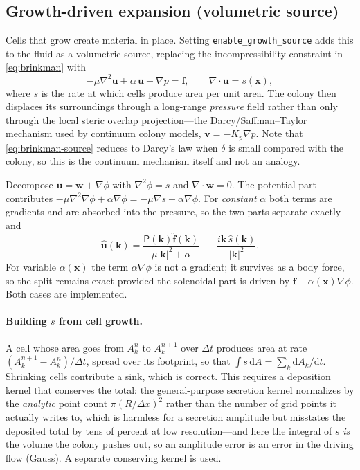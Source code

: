 \documentclass[11pt]{article}
\newcommand{\vu}{\bm{u}}
\newcommand{\vf}{\bm{f}}
\newcommand{\vx}{\bm{x}}
\newcommand{\vk}{\bm{k}}
\newcommand{\grad}{\nabla}
\newcommand{\dt}{\Delta t}
\newcommand{\dx}{\Delta x}
\begin{document}
\subsection{Growth-driven expansion (volumetric source)}\label{sec:growthsource}
Cells that grow create material in place. Setting
\texttt{enable\_growth\_source} adds this to the fluid as a volumetric source,
replacing the incompressibility constraint in \eqref{eq:brinkman} with
\begin{equation}
  -\mu\grad^2\vu + \alpha\,\vu + \grad p = \vf, \qquad
  \grad\cdot\vu = s(\vx),
  \label{eq:brinkman-source}
\end{equation}
where $s$ is the rate at which cells produce area per unit area. The colony then
displaces its surroundings through a long-range \emph{pressure} field rather than
only through the local steric overlap projection---the Darcy/Saffman--Taylor
mechanism used by continuum colony models, $\bm{v} = -K_p\grad p$. Note that
\eqref{eq:brinkman-source} reduces to Darcy's law when $\delta$ is small compared
with the colony, so this is the continuum mechanism itself and not an analogy.

Decompose $\vu = \bm{w} + \grad\phi$ with $\grad^2\phi = s$ and
$\grad\cdot\bm{w} = 0$. The potential part contributes
$-\mu\grad^2\grad\phi + \alpha\grad\phi = -\mu\grad s + \alpha\grad\phi$. For
\emph{constant} $\alpha$ both terms are gradients and are absorbed into the
pressure, so the two parts separate exactly and
\begin{equation}
  \hat{\vu}(\vk) = \frac{\mathsf{P}(\vk)\hat{\vf}(\vk)}{\mu\lvert\vk\rvert^2+\alpha}
  \;-\; \frac{i\vk\,\hat{s}(\vk)}{\lvert\vk\rvert^2}.
\end{equation}
For variable $\alpha(\vx)$ the term $\alpha\grad\phi$ is not a gradient; it
survives as a body force, so the split remains exact provided the solenoidal part
is driven by $\vf - \alpha(\vx)\grad\phi$. Both cases are implemented.

\paragraph{Building $s$ from cell growth.} A cell whose area goes from $A_k^{n}$
to $A_k^{n+1}$ over $\dt$ produces area at rate $(A_k^{n+1}-A_k^{n})/\dt$, spread
over its footprint, so that
$\int s\,\mathrm{d}A = \sum_k \mathrm{d}A_k/\mathrm{d}t$. Shrinking cells
contribute a sink, which is correct. This requires a deposition kernel that
conserves the total: the general-purpose secretion kernel normalizes by the
\emph{analytic} point count $\pi(R/\dx)^2$ rather than the number of grid points
it actually writes to, which is harmless for a secretion amplitude but misstates
the deposited total by tens of percent at low resolution---and here the integral
of $s$ \emph{is} the volume the colony pushes out, so an amplitude error is an
error in the driving flow (Gauss). A separate conserving kernel is used.
\end{document}
